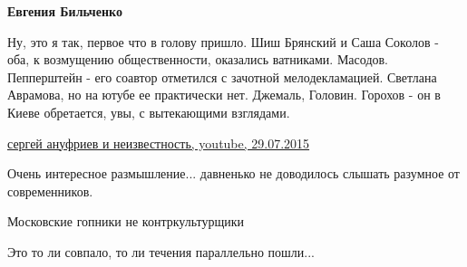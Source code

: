\begin{itemize}
\begin{itemize}
 
\textbf{Евгения Бильченко} 

Ну, это я так, первое что в голову пришло. Шиш Брянский и Саша Соколов - оба, к
возмущению общественности, оказались ватниками. Масодов. Пепперштейн - его
соавтор отметился с зачотной мелодекламацией. Светлана Аврамова, но на ютубе ее
практически нет. Джемаль, Головин. Горохов - он в Киеве обретается, увы, с
вытекающими взглядами.

\href{https://www.youtube.com/watch?v=u81ms6pYUAc}{%
сергей ануфриев и неизвестность, youtube, 29.07.2015%
}
\end{itemize}

 
Очень интересное размышление... давненько не доводилось слышать разумное от современников.

 

Московские гопники не контркультурщики

Это то ли совпало, то ли течения параллельно пошли...

\end{itemize}

